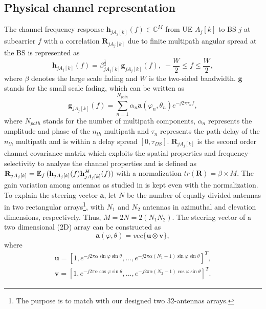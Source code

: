 \subsection{Physical channel representation}
The channel frequency response $\mathbf{h}_{jA_j[k]}(f)\in\mathbb{C}^{M}$ from UE $A_j[k]$ to BS $j$ at subcarrier $f$ with a correlation $\mathbf{R}_{jA_{j}[k]}$ due to finite multipath angular spread at the BS  is represented as
\begin{equation}
\mathbf{h}_{jA_{j}[k]}(f)=\beta^{\frac{1}{2}}_{jA_{j}[k]}\mathbf{g}_{jA_{j}[k]}(f),\;-\frac{W}{2}\leq f\leq \frac{W}{2},
\end{equation}
where $\beta$ denotes the large scale fading and $W$ is the two-sided bandwidth. $\mathbf{g}$ stands for the small scale fading, which can be written as
\begin{equation}
 \mathbf{g}_{jA_{j}[k]}(f)=\sum_{n=1}^{N_{path}}\alpha_{n}\mathbf{a}(\varphi_n,\theta_n)e^{-j2\pi\tau_{n}f},
\end{equation}
where $N_{path}$ %
stands for the number of multipath components, $\alpha_n$  %
represents the amplitude and phase of the $n_{th}$ multipath and $\tau_n$ represents the path-delay of the $n_{th}$ multipath and is within a delay spread $[0,\tau_{DS}]$. 
$\mathbf{R}_{jA_{j}[k]}$ is the second order channel covariance matrix which exploits the spatial properties and frequency-selectivity to analyze the channel properties and is defined as $\mathbf{R}_{jA_j[k]}=\operatorname{\mathbb{E}}_f{({\mathbf{h}}_{jA_j[k]}(f){\mathbf{h}}_{jA_j[k]}^H(f))}$ with a normalization $tr(\mathbf{R})=\beta\times M$. The gain variation among antennas as studied in \cite{chen2017finite} is kept even with the normalization. To explain the steering vector $\mathbf{a}$, let $N$ be the number of equally divided antennas in two rectangular arrays\footnote{The purpose is to match with our designed two 32-antennas arrays.}, with $N_1$ and $N_2$ antennas in azimuthal and elevation dimensions, respectively. Thus, $M=2N=2(N_1N_2)$. The  steering vector of a two dimensional (2D) array can be constructed as
\begin{equation}
\mathbf{a}(\varphi,\theta)=vec\big\{\mathbf{u}\otimes\mathbf{v}\big\},
\label{eq:steervector}
\end{equation}
where
\begin{equation}
\begin{split}
\mathbf{u}=[1,e^{-j2\pi \alpha\sin\varphi\sin\theta},...,e^{-j2\pi \alpha (N_1-1)\sin\varphi\sin\theta}]^T, \\
\mathbf{v}=[1,e^{-j2\pi \alpha\cos\varphi\sin\theta},...,e^{-j2\pi \alpha(N_2-1)\cos\varphi\sin\theta}]^T.
\end{split}
\end{equation}
